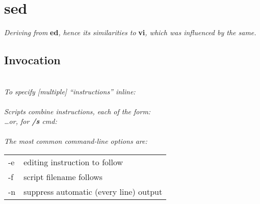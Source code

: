 \section{sed}
\textit{Deriving from  }\textbf{ed}\textit{, hence its similarities to }\textbf{vi}\textit{, which was influenced by the same.}


\subsection*{Invocation}
\\[1mm]
\textit{To specify [multiple] ``instructions'' inline:}\\
\\[1mm]
\textit{Scripts combine instructions, each of the form:}\\
 \quad \textit{\dots or, for \textbf{/s} cmd:}\\
\\[1mm]
\textit{The most common command-line options are:}\\
\begin{tabular}{l l}
    -e & editing instruction to follow \\
    -f & script filename follows \\
    -n & suppress automatic (every line) output \\
\end{tabular} 



